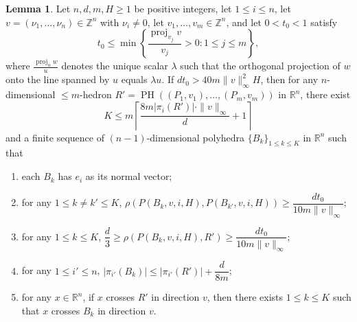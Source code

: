 \documentclass{amsart}
\theoremstyle{definition}
\newtheorem{lemma}[theorem]{Lemma}
\newcommand{\Z}{\mathbb Z}
\DeclareMathOperator{\proj}{proj}
\begin{document}
\begin{lemma}\label{lem:mainpoly}
Let $n, d, m, H\geq 1$ be positive integers, let $1\leq i\leq n$, let
$v=(\nu_1,\dots,\nu_n)\in \mathbb{Z}^n$ with $\nu_i\neq0$, let
$v_1,\dots, v_m\in \Z^n$, and let $0<t_0<1$ satisfy
\[
t_0\leq\min\left\{\frac{\proj_{v_j} v}{v_j}>0\colon 1\leq j\leq m\right\},
\]
where $\frac{\proj_u w}{u}$ denotes the unique scalar $\lambda$ such that the
orthogonal projection of $w$ onto the line spanned by $u$ equals $\lambda u$.
If $d t_0>40m\|v\|_\infty^2 H$, then for any $n$-dimensional
$\leq\! m$-hedron $R'=\operatorname{PH}((P_1,v_1),\dots,(P_m,v_m))$ in
$\mathbb{R}^n$, there exist
\[
K\leq m\left\lceil \frac{8m|\pi_i(R')|\cdot\|v\|_\infty}{d}+1\right\rceil
\]
and a finite sequence of $(n-1)$-dimensional polyhedra
$\{B_k\}_{1\leq k\leq K}$ in $\mathbb{R}^n$ such that
\begin{enumerate}
\item[(1)] each $B_k$ has $e_i$ as its normal vector;
\item[(2)] for any $1\leq k\neq k'\leq K$,
$\rho(P(B_k, v, i, H),P(B_{k'}, v, i, H))\geq \dfrac{d t_0}{10m\|v\|_\infty}$;
\item[(3)] for any $1\leq k\leq K$,
$\dfrac{d}{3}\geq\rho(P(B_k, v, i, H),R')\geq \dfrac{d t_0}{10m\|v\|_\infty}$;
\item[(4)] for any $1\leq i'\leq n$,
$|\pi_{i'}(B_k)|\leq |\pi_{i'}(R')|+\dfrac{d}{8m}$;
\item[(5)] for any $x\in\mathbb{R}^n$, if $x$ crosses $R'$ in direction $v$,
then there exists $1\leq k\leq K$ such that $x$ crosses $B_k$ in direction
$v$.
\end{enumerate}
\end{lemma}
\end{document}
